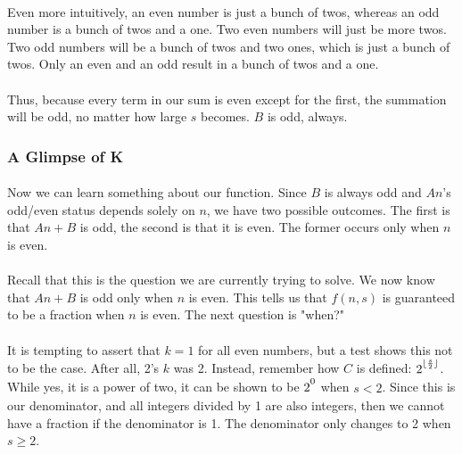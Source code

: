 \documentclass[12pt,letterpaper]{article}
\begin{document}
			\paragraph{} Even more intuitively, an even number is just a bunch of twos, whereas an odd number is a bunch of twos and a one. Two even numbers will just be more twos. Two odd numbers will be a bunch of twos and two ones, which is just a bunch of twos. Only an even and an odd result in a bunch of twos and a one.
			
			\paragraph{} Thus, because every term in our sum is even except for the first, the summation will be odd, no matter how large $s$ becomes. $B$ is odd, always.
			
		\subsubsection{A Glimpse of K}
		
			\paragraph{} Now we can learn something about our function. Since $B$ is always odd and $An$'s odd/even status depends solely on $n$, we have two possible outcomes. The first is that $An + B$ is odd, the second is that it is even. The former occurs only when $n$ is even.
			
			\paragraph{} Recall that this is the question we are currently trying to solve. We now know that $An + B$ is odd only when $n$ is even. This tells us that $f(n, s)$ is guaranteed to be a fraction when $n$ is even. The next question is "when?"
			
			\paragraph{} It is tempting to assert that $k = 1$ for all even numbers, but a test shows this not to be the case. After all, 2's $k$ was 2. Instead, remember how $C$ is defined: $2\strut^{\lfloor \frac{s}{2} \rfloor}$. While yes, it is a power of two, it can be shown to be $2\strut^0$ when $s < 2$. Since this is our denominator, and all integers divided by 1 are also integers, then we cannot have a fraction if the denominator is 1. The denominator only changes to 2 when $s \geqslant 2$.
			
\end{document}
